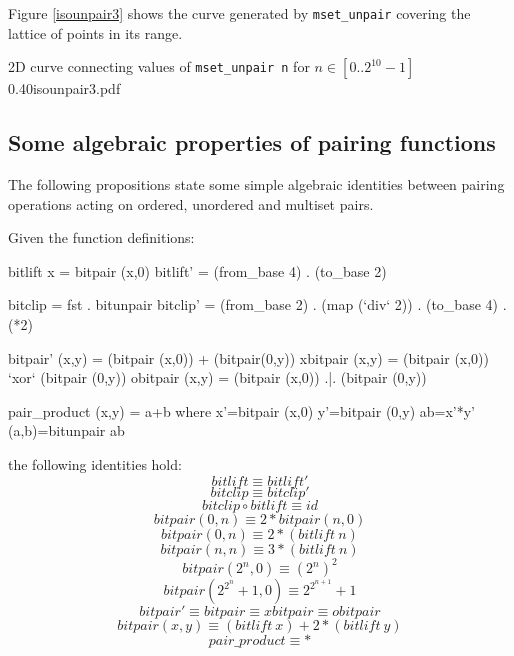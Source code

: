 \documentclass[]{INCLUDES/llncs}
\begin{document}
Figure \ref{isounpair3} shows the curve generated by {\tt mset\_unpair}
covering the lattice of points in its range.

{2D curve connecting values of {\tt mset\_unpair n} for $n \in [0..2^{10}-1]$}
{0.40}{isounpair3.pdf}


\subsection{Some algebraic properties of pairing functions}
The following propositions state some simple
algebraic identities between pairing operations acting on ordered, unordered and multiset pairs.

\begin{prop}
Given the function definitions:
\begin{code}
bitlift x = bitpair (x,0)
bitlift' = (from_base 4) . (to_base 2)

bitclip = fst . bitunpair
bitclip' = (from_base 2) . (map (`div` 2)) . (to_base 4) . (*2)

bitpair' (x,y) = (bitpair (x,0))   +   (bitpair(0,y))
xbitpair (x,y) = (bitpair (x,0)) `xor` (bitpair (0,y))
obitpair (x,y) = (bitpair (x,0))  .|.  (bitpair (0,y))

pair_product (x,y) = a+b where
  x'=bitpair (x,0)
  y'=bitpair (0,y)
  ab=x'*y'
  (a,b)=bitunpair ab
\end{code}
the following identities hold:
\begin{equation}
bitlift \equiv bitlift'
\end{equation}
\begin{equation}
bitclip \equiv bitclip'
\end{equation}
\begin{equation}
bitclip \circ bitlift \equiv id 
\end{equation}
\begin{equation}
bitpair (0,n) \equiv 2*bitpair(n,0)
\end{equation}
\begin{equation}
bitpair (0,n) \equiv 2*(bitlift~n)
\end{equation}
\begin{equation}
bitpair (n,n) \equiv 3*(bitlift~n)
\end{equation}
\begin{equation}  \label{bitpow}
bitpair (2^n,0) \equiv  ({2^n})^2
\end{equation}
\begin{equation}  \label{biteq}
bitpair (2^{2^n}+1,0) \equiv 2^{2^{n+1}}+1
\end{equation}
\begin{equation}
bitpair' \equiv bitpair \equiv xbitpair \equiv obitpair
\end{equation}
\begin{equation}
bitpair (x,y) \equiv (bitlift~x)+2*(bitlift~y) 
\end{equation}
\begin{equation}
pair\_product \equiv *
\end{equation}
\end{prop}
\end{document}
